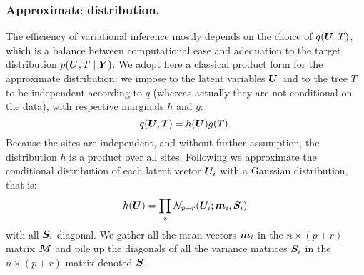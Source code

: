 \subsubsection*{Approximate distribution.}
The efficiency of variational inference mostly depends on the choice of $q({\boldsymbol{U}}, T)$, which is a balance between computational ease and adequation to the target distribution $p({\boldsymbol{U}}, T \mid {\boldsymbol{Y}})$. We adopt here a classical product form for the approximate distribution: we impose to the latent variables ${\boldsymbol{U}}$ and to the tree $T$ to be independent according to $q$ (whereas actually they are not conditional on the data), with respective marginals $h$ and $g$:
$$
q({\boldsymbol{U}}, T) =  h({\boldsymbol{U}})g(T).
$$
Because the sites are independent, and without further assumption, the distribution $h$ is a product over all sites. Following \cite{CMR18} we approximate the conditional distribution of each latent vector ${\boldsymbol{U}}_i$ with a Gaussian distribution, that is:
$$
h({\boldsymbol{U}}) = \prod_i {\mathcal{N}}_{p+r}({\boldsymbol{U}}_i; {\boldsymbol{m}}_i, {\boldsymbol{S}}_i)
$$
with all ${\boldsymbol{S}}_i$ diagonal. We gather all the mean vectors ${\boldsymbol{m}}_i$ in the $n \times (p+r)$ matrix ${\boldsymbol{M}}$ and pile up the diagonals of all the variance matrices ${\boldsymbol{S}}_i$ in the $n \times (p+r)$ matrix denoted ${\boldsymbol{S}}$.

